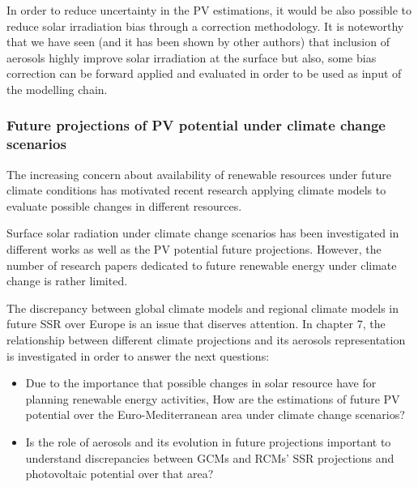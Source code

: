In order to reduce uncertainty in the PV estimations, it would be also possible to reduce solar irradiation bias through a correction methodology. It is noteworthy that we have seen (and it has been shown by other authors) that inclusion of aerosols highly improve solar irradiation at the surface but also, some bias correction can be forward applied and evaluated in order to be used as input of the modelling chain.  



\subsubsection{Future projections of PV potential under climate change scenarios}

The increasing concern about availability of renewable resources under future climate conditions has motivated recent research applying climate models to evaluate possible changes in different resources. 

Surface solar radiation under climate change scenarios has been investigated in different works as well as the PV potential future projections. However, the number of research papers dedicated to future renewable energy under climate change is rather limited.

The discrepancy between global climate models and regional climate models in future SSR over Europe is an issue that diserves attention. In chapter 7, the relationship between different climate projections and its aerosols representation is investigated in order to answer the next questions:

\begin{itemize}
\item Due to the importance that possible changes in solar resource have for planning renewable energy activities, How are the estimations of future PV potential over the Euro-Mediterranean area under climate change scenarios?
\item Is the role of aerosols and its evolution in future projections important to understand discrepancies between GCMs and RCMs' SSR projections and photovoltaic potential over that area?

\end{itemize}

